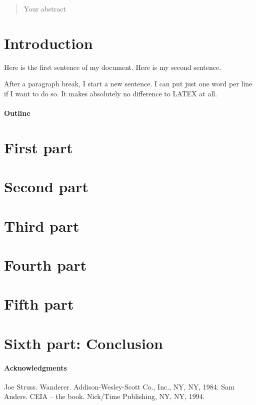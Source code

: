\documentclass[10pt,aps,showpacs,nofootinbib,superscriptaddress,eqsecnum,prd,showkeys,twocolumn,notitlepage]{article}
\begin{document}
\maketitle

\begin{center}
\begin{abstract}
Your abstract
\end{abstract}
\end{center}

\section{Introduction}
Here is the first sentence of my document.
Here is my second sentence.

After a paragraph break, I start a new sentence.
I can put just
one
word per
line if I want to do so.
It makes absolutely no difference to LATEX at all.

\paragraph{Outline}

\section{First part}

\section{Second part}

\section{Third part}

\section{Fourth part}

\section{Fifth part}

\section{Sixth part: Conclusion}

\paragraph{Acknowledgments}

\begin{thebibliography}{9}
 Joe Struss. Wanderer.
Addison-Wesley-Scott Co., Inc., NY, NY, 1984.
 Sam Anders. CEIA -- the book.
Nick/Time Publishing, NY, NY, 1994.
\end{thebibliography}
\end{document}
